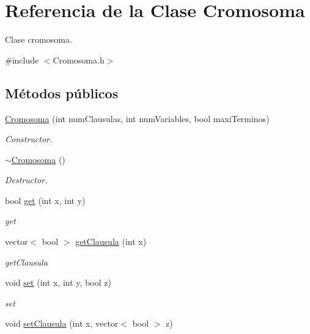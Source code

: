 \hypertarget{classCromosoma}{\section{Referencia de la Clase Cromosoma}
\label{classCromosoma}
}


Clase cromosoma.  




{\ttfamily \#include $<$Cromosoma.\-h$>$}

\subsection*{Métodos públicos}
\begin{DoxyCompactItemize}
\item 
\hyperlink{classCromosoma_a8fca0c1bd72c65aac6c2f26494e2c5f9}{Cromosoma} (int num\-Clausulas, int num\-Variables, bool maxi\-Terminos)
\begin{DoxyCompactList}\small\item\em Constructor. \end{DoxyCompactList}\item 
\hyperlink{classCromosoma_a39310d043c187768ba83a1a9c921e966}{$\sim$\-Cromosoma} ()
\begin{DoxyCompactList}\small\item\em Destructor. \end{DoxyCompactList}\item 
bool \hyperlink{classCromosoma_a59d6a42685e8b6e983b496d8051e4168}{get} (int x, int y)
\begin{DoxyCompactList}\small\item\em get \end{DoxyCompactList}\item 
vector$<$ bool $>$ \hyperlink{classCromosoma_a400e7970b9e2d9995cbc6b1f4335fd51}{get\-Clausula} (int x)
\begin{DoxyCompactList}\small\item\em get\-Clausula \end{DoxyCompactList}\item 
void \hyperlink{classCromosoma_aaf002d2f7f9438e74eeba52892868e83}{set} (int x, int y, bool z)
\begin{DoxyCompactList}\small\item\em set \end{DoxyCompactList}\item 
void \hyperlink{classCromosoma_a826283527e3bdefe28a7ba7fc84dc965}{set\-Clausula} (int x, vector$<$ bool $>$ z)

\end{DoxyCompactItemize}
